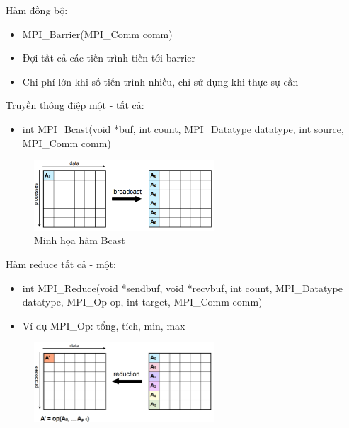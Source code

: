 \documentclass[14pt, a4paper]{article}
\numberwithin{equation}{section}
\numberwithin{figure}{section}
\numberwithin{dl}{section}
\numberwithin{md}{section}
\numberwithin{bd}{section}
\numberwithin{dn}{section}
\numberwithin{hq}{section}
\begin{document}
Hàm đồng bộ:

\begin{itemize}
    \item MPI\_Barrier(MPI\_Comm comm)
    \item Đợi tất cả các tiến trình tiến tới barrier
    \item Chi phí lớn khi số tiến trình nhiều, chỉ sử dụng khi thực sự cần
\end{itemize}

Truyền thông điệp một - tất cả:

\begin{itemize}
    \item int MPI\_Bcast(void *buf, int count,
                         MPI\_Datatype datatype, int source,
                         MPI\_Comm comm)
\end{itemize}

\begin{figure}[H]
    \centering
    \includegraphics[width=0.6\textwidth]{figures/MPI/Bcast.png}
    \caption{Minh họa hàm Bcast}
\end{figure}

Hàm reduce tất cả - một:

\begin{itemize}
    \item int MPI\_Reduce(void *sendbuf, void *recvbuf,
                         int count, MPI\_Datatype datatype,
                         MPI\_Op op, int target, MPI\_Comm comm)
    \item Ví dụ MPI\_Op: tổng, tích, min, max
\end{itemize}

\begin{figure}[H]
    \centering
    \includegraphics[width=0.6\textwidth]{figures/MPI/Reduction_All_To_One.png}
\end{figure}
\end{document}
